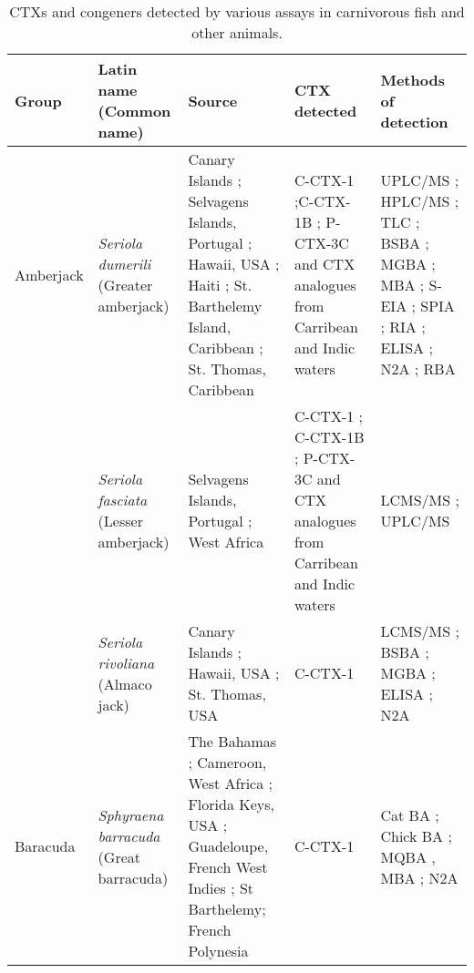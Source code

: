 \documentclass[12pt]{article}
\begin{document}
\FloatBarrier
\begin{longtable}{  | p{2cm} | p{3cm} | p{4.5cm}  | p{2cm} | p{3cm}  | }
\caption{CTXs and congeners detected by various assays in carnivorous fish and other animals.}\\
\label{tbl:CarnTable}
\textbf{Group} & \textbf{Latin name} (Common name) & \textbf{Source} & \textbf{CTX detected} & \textbf{Methods of detection} \\
\hline
Amberjack &  \emph{Seriola dumerili} (Greater amberjack) & Canary Islands \cite{caillaud2012towards}; Selvagens Islands, Portugal \cite{otero2010first}; Hawaii, USA \cite{campora2008detection,hokama1977radioimmunoassay,hokama1983rapid,hokama1985rapid}; Haiti \cite{poli1997identification}; St. Barthelemy Island, Caribbean \cite{vernoux1986heterogeneity}; St. Thomas, Caribbean \cite{granade1976ciguatera} & C-CTX-1 \cite{poli1997identification};C-CTX-1B \cite{otero2010first}; P-CTX-3C and CTX analogues from Carribean and Indic waters \cite{otero2010first} & UPLC/MS \cite{otero2010first}; HPLC/MS \cite{poli1997identification}; TLC \cite{vernoux1986heterogeneity}; BSBA \cite{granade1976ciguatera}; MGBA \cite{campora2008detection,granade1976ciguatera}; MBA \cite{hokama1983rapid,hokama1985rapid,vernoux1986heterogeneity}; S-EIA \cite{hokama1985rapid}; SPIA \cite{otero2010first}; RIA \cite{campora2008detection,hokama1983rapid}; ELISA \cite{campora2008detection}; N2A \cite{caillaud2012towards,campora2008detection}; RBA \cite{} \\
  & \emph{Seriola fasciata} (Lesser amberjack) & Selvagens Islands, Portugal \cite{otero2010first}; West Africa \cite{boada2010ciguatera} & C-CTX-1 \cite{boada2010ciguatera}; C-CTX-1B \cite{otero2010first}; P-CTX-3C and CTX analogues from Carribean and Indic waters \cite{otero2010first} & LCMS/MS \cite{boada2010ciguatera}; UPLC/MS \cite{otero2010first}\\
 & \emph{Seriola rivoliana} (Almaco jack) & Canary Islands \cite{campora2010evaluating}; Hawaii, USA \cite{campora2008detection}; St. Thomas, USA \cite{granade1976ciguatera} & C-CTX-1 \cite{} & LCMS/MS \cite{}; BSBA \cite{granade1976ciguatera}; MGBA \cite{granade1976ciguatera}; ELISA \cite{campora2008detection,campora2010evaluating}; N2A \cite{campora2008detection,campora2010evaluating} \\
 \hline
Baracuda & \emph{Sphyraena barracuda} (Great barracuda) & The Bahamas \cite{o2012linking}; Cameroon, West Africa \cite{bienfang2008ciguatera}; Florida Keys, USA \cite{dechraoui2005use}; Guadeloupe, French West Indies \cite{pottier2003identification,pottier2001ciguatera}; St Barthelemy\cite{pottier2001ciguatera,vernoux1986heterogeneity}; French Polynesia \cite{bagnis1987use} & C-CTX-1 \cite{dechraoui2005use,pottier2003identification} & Cat BA \cite{bagnis1987use}; Chick BA \cite{pottier2001ciguatera}; MQBA \cite{bagnis1987use}, MBA \cite{bagnis1987use}; N2A \cite{o2012linking} \\

\end{longtable}
\end{document}
